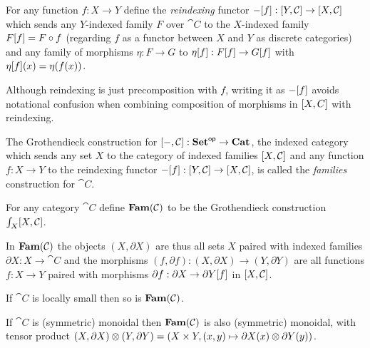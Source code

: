 \begin{definition}[Reindexing]
For any function $f: X \to Y$ define the \emph{reindexing} functor $-[f]: [Y,\mathcal{C}] \to
[X,\mathcal{C}]$ which sends any $Y$-indexed family $F$ over $\cat{C}$ to the $X$-indexed family
$F[f] = F \circ f$ (regarding $f$ as a functor between $X$ and $Y$ as discrete categories) and any
family of morphisms $\eta: F \to G$ to $\eta[f]: F[f] \to G[f]$ with
$\eta[f](x) = \eta(f(x))$. 
\end{definition}

\noindent Although reindexing is just precomposition with $f$, writing it as $-[f]$ avoids
notational confusion when combining composition of morphisms in $[X,C]$ with reindexing.

The Grothendieck construction for $[-,\mathcal{C}]: \mathbf{Set}^{\mathsf{op}} \to \mathbf{Cat}$, the indexed category which sends
any set $X$ to the category of indexed families $[X,\mathcal{C}]$ and any function $f: X \to Y$ to the
reindexing functor $-[f]: [Y,\mathcal{C}] \to [X,\mathcal{C}]$, is called the \emph{families}
construction for $\cat{C}$.

\begin{definition}
\label{def:Fam}
For any category $\cat{C}$ define $\mathbf{Fam}(\mathcal{C})$ to be the Grothendieck construction
$\int_{X}[X,\mathcal{C}]$.
\end{definition}

\noindent In $\mathbf{Fam}(\mathcal{C})$ the objects $(X, \partial X)$ are thus all sets $X$ paired with indexed families
$\partial X: X \to \cat{C}$ and the morphisms $(f, \partial f): (X, \partial X) \to (Y, \partial Y)$ are all
functions $f: X \to Y$ paired with morphisms $\partial f: \partial X \to \partial Y[f]$ in
$[X,\mathcal{C}]$.

\begin{proposition}
\label{prop:Grothendieck:fam-inherits-local-smallness}
If $\cat{C}$ is locally small then so is $\mathbf{Fam}(\mathcal{C})$.
\end{proposition}

\begin{proposition}
\label{prop:Grothendieck:fam-inherits-products}
If $\cat{C}$ is (symmetric) monoidal then $\mathbf{Fam}(\mathcal{C})$ is also (symmetric) monoidal, with tensor product
$(X, \partial X) \otimes (Y, \partial Y) = (X \times Y,(x, y) \mapsto \partial X(x) \otimes \partial Y(y))$.
\end{proposition}

